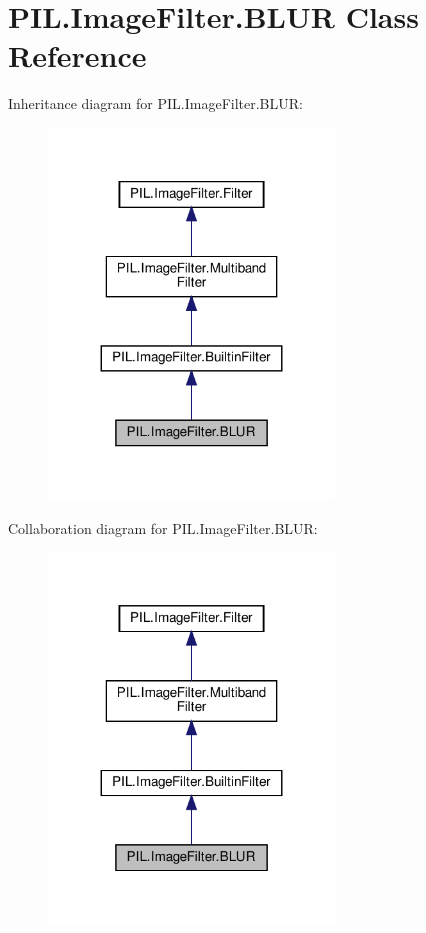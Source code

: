 \hypertarget{classPIL_1_1ImageFilter_1_1BLUR}{}\section{P\+I\+L.\+Image\+Filter.\+B\+L\+UR Class Reference}
\label{classPIL_1_1ImageFilter_1_1BLUR}


Inheritance diagram for P\+I\+L.\+Image\+Filter.\+B\+L\+UR\+:
\nopagebreak
\begin{figure}[H]
\begin{center}
\leavevmode
\includegraphics[width=215pt]{classPIL_1_1ImageFilter_1_1BLUR__inherit__graph}
\end{center}
\end{figure}


Collaboration diagram for P\+I\+L.\+Image\+Filter.\+B\+L\+UR\+:
\nopagebreak
\begin{figure}[H]
\begin{center}
\leavevmode
\includegraphics[width=215pt]{classPIL_1_1ImageFilter_1_1BLUR__coll__graph}
\end{center}
\end{figure}
